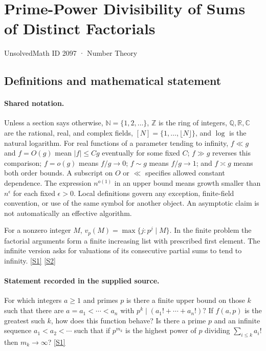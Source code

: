 \documentclass[11pt,a4paper]{article}
\newcommand{\N}{\mathbb{N}}
\newcommand{\Z}{\mathbb{Z}}
\newcommand{\Q}{\mathbb{Q}}
\newcommand{\R}{\mathbb{R}}
\newcommand{\C}{\mathbb{C}}
\newcommand{\sref}[2]{\hyperlink{source:#1:#2}{[S#2]}}
\begin{document}

\setcounter{section}{2096}

\section{Prime-Power Divisibility of Sums of Distinct Factorials}\label{2097}

{\small\sffamily UnsolvedMath ID 2097 · Number Theory}

\subsection{Definitions and mathematical statement}

\paragraph{Shared notation.}Unless a section says otherwise, $\N=\{1,2,\ldots\}$,
$\Z$ is the ring of integers, $\Q,\R,\C$ are the rational, real, and complex
fields, $[N]=\{1,\ldots,\lfloor N\rfloor\}$, and $\log$ is the natural
logarithm. For real functions of a parameter tending to infinity,
$f\ll g$ and $f=O(g)$ mean $|f|\leq Cg$ eventually for some fixed $C$;
$f\gg g$ reverses this comparison; $f=o(g)$ means $f/g\to0$;
$f\sim g$ means $f/g\to1$; and $f\asymp g$ means both order bounds.
A subscript on $O$ or $\ll$ specifies allowed constant dependence.
The expression $n^{o(1)}$ in an upper bound means growth smaller than
$n^\epsilon$ for each fixed $\epsilon>0$. Local definitions govern any
exception, finite-field convention, or use of the same symbol for another
object. An asymptotic claim is not automatically an effective algorithm.



For a nonzero integer $M$, $v_p(M)=\max\{j:p^j\mid M\}$. In the finite problem the factorial arguments form a finite increasing list with prescribed first element. The infinite version asks for valuations of its consecutive partial sums to tend to infinity. \sref{2097}{1} \sref{2097}{2}

\paragraph{Statement recorded in the supplied source.}
For which integers $a\geq 1$ and primes $p$ is there a finite upper bound on those $k$ such that there are $a=a_1<\cdots<a_n$ with $ p^k \mid (a_1!+\cdots+a_n!)? $ If $f(a,p)$ is the greatest such $k$, how does this function behave?
Is there a prime $p$ and an infinite sequence $a_1<a_2<\cdots$ such that if $p^{m_k}$ is the highest power of $p$ dividing $\sum_{i\leq k}a_i!$ then $m_k\to \infty$? \sref{2097}{1}
\end{document}
